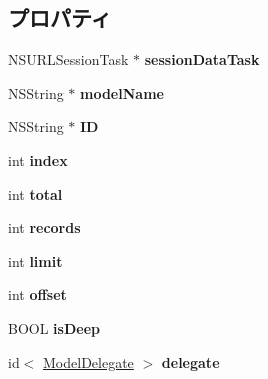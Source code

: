 \subsection*{プロパティ}
\begin{DoxyCompactItemize}
\item 
\hypertarget{interface_model_base_a3de4b95e8f4d6f8e117296715846d1b5}{}N\+S\+U\+R\+L\+Session\+Task $\ast$ {\bfseries session\+Data\+Task}\label{interface_model_base_a3de4b95e8f4d6f8e117296715846d1b5}

\item 
\hypertarget{interface_model_base_ac46f569904aad001e7b77e4c4fe87564}{}N\+S\+String $\ast$ {\bfseries model\+Name}\label{interface_model_base_ac46f569904aad001e7b77e4c4fe87564}

\item 
\hypertarget{interface_model_base_a73a6fc351d318c258fd28f54b6dd0e86}{}N\+S\+String $\ast$ {\bfseries I\+D}\label{interface_model_base_a73a6fc351d318c258fd28f54b6dd0e86}

\item 
\hypertarget{interface_model_base_a632530572a1c842f6ca0316a27735731}{}int {\bfseries index}\label{interface_model_base_a632530572a1c842f6ca0316a27735731}

\item 
\hypertarget{interface_model_base_a15c7d3816fbd6ce11736b715c5924d52}{}int {\bfseries total}\label{interface_model_base_a15c7d3816fbd6ce11736b715c5924d52}

\item 
\hypertarget{interface_model_base_aa8778446d779e442b44987acd010ba76}{}int {\bfseries records}\label{interface_model_base_aa8778446d779e442b44987acd010ba76}

\item 
\hypertarget{interface_model_base_aaef7fad5237d03c1530768468877e853}{}int {\bfseries limit}\label{interface_model_base_aaef7fad5237d03c1530768468877e853}

\item 
\hypertarget{interface_model_base_a28d7aa413f0e1fa4208ff49290838a77}{}int {\bfseries offset}\label{interface_model_base_a28d7aa413f0e1fa4208ff49290838a77}

\item 
\hypertarget{interface_model_base_af8afd46fc141e9ed3e0fc7f158c838dd}{}B\+O\+O\+L {\bfseries is\+Deep}\label{interface_model_base_af8afd46fc141e9ed3e0fc7f158c838dd}

\item 
\hypertarget{interface_model_base_a332271edf203e8dcd55ff2ceedc0252d}{}id$<$ \hyperlink{protocol_model_delegate-p}{Model\+Delegate} $>$ {\bfseries delegate}\label{interface_model_base_a332271edf203e8dcd55ff2ceedc0252d}

\end{DoxyCompactItemize}


